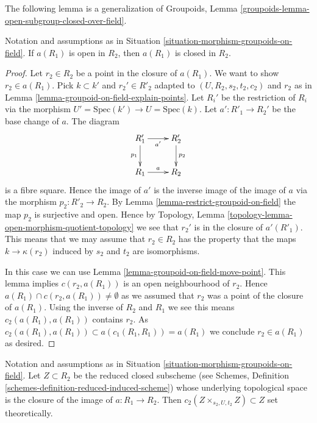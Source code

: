 \noindent
The following lemma is a generalization of
Groupoids, Lemma \ref{groupoids-lemma-open-subgroup-closed-over-field}.

\begin{lemma}
\label{lemma-open-image-is-closed}
Notation and assumptions as in
Situation \ref{situation-morphism-groupoids-on-field}.
If $a(R_1)$ is open in $R_2$, then $a(R_1)$ is closed in $R_2$.
\end{lemma}

\begin{proof}
Let $r_2 \in R_2$ be a point in the closure of $a(R_1)$.
We want to show $r_2 \in a(R_1)$. Pick $k \subset k'$ and
$r_2' \in R'_2$ adapted to $(U, R_2, s_2, t_2, c_2)$ and $r_2$ as in
Lemma \ref{lemma-groupoid-on-field-explain-points}.
Let $R_i'$ be the restriction of $R_i$ via the morphism
$U' = \text{Spec}(k') \to U = \text{Spec}(k)$.
Let $a' : R'_1 \to R_2'$ be the base change of $a$. The diagram
$$
\xymatrix{
R'_1 \ar[r]_{a'} \ar[d]_{p_1} & R'_2 \ar[d]^{p_2} \\
R_1 \ar[r]^a & R_2
}
$$
is a fibre square. Hence the image of $a'$ is the inverse image of
the image of $a$ via the morphism $p_2 : R'_2 \to R_2$. By
Lemma \ref{lemma-restrict-groupoid-on-field}
the map $p_2$ is surjective and open. Hence by
Topology, Lemma \ref{topology-lemma-open-morphism-quotient-topology}
we see that $r_2'$ is in the closure of $a'(R'_1)$.
This means that we may assume that $r_2 \in R_2$ has
the property that the maps $k \to \kappa(r_2)$ induced
by $s_2$ and $t_2$ are isomorphisms.

\medskip\noindent
In this case we can use
Lemma \ref{lemma-groupoid-on-field-move-point}.
This lemma implies $c(r_2, a(R_1))$ is an open neighbourhood of $r_2$.
Hence $a(R_1) \cap c(r_2, a(R_1)) \not = \emptyset$ as we assumed
that $r_2$ was a point of the closure of $a(R_1)$.
Using the inverse of $R_2$ and $R_1$ we see this means
$c_2(a(R_1), a(R_1))$ contains $r_2$.
As $c_2(a(R_1), a(R_1)) \subset a(c_1(R_1, R_1)) = a(R_1)$
we conclude $r_2 \in a(R_1)$ as desired.
\end{proof}

\begin{lemma}
\label{lemma-map-groupoids-on-field-image}
Notation and assumptions as in
Situation \ref{situation-morphism-groupoids-on-field}.
Let $Z \subset R_2$ be the reduced closed subscheme (see
Schemes, Definition \ref{schemes-definition-reduced-induced-scheme})
whose underlying topological space is the closure of the image of
$a : R_1 \to R_2$. Then
$c_2(Z \times_{s_2, U, t_2} Z) \subset Z$
set theoretically.
\end{lemma}

